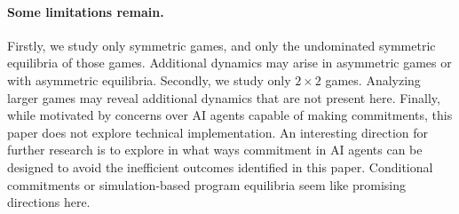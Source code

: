 \documentclass[letterpaper]{article}
\theoremstyle{definition}
\begin{document}

\paragraph{Some limitations remain.}


Firstly, we study only symmetric games, and only the undominated symmetric equilibria of those games. Additional dynamics may arise in asymmetric games or with asymmetric equilibria. Secondly, we study only $2\times2$ games. Analyzing larger games may reveal additional dynamics that are not present here. Finally, while motivated by concerns over AI agents capable of making commitments, this paper does not explore technical implementation. An interesting direction for further research is to explore in what ways commitment in AI agents can be designed to avoid the inefficient outcomes identified in this paper. Conditional commitments \citep[]{kalai_commitment_2010} or simulation-based program equilibria \citep[]{cooper_characterising_2024} seem like promising directions here.


\end{document}
